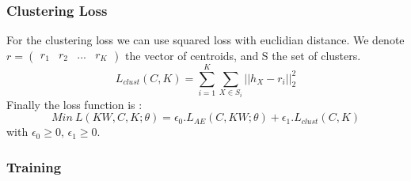 \subsubsection{Clustering Loss}

For the clustering loss we can use squared loss with euclidian distance. We
denote $r = \begin{pmatrix} r_1 & r_2 & ... & r_K\end{pmatrix}$ the vector of
centroids, and S the set of clusters.  
\begin{equation}\label{eq:loss_clust}
  L_{clust}(C,K) = \sum_{i=1}^K \sum_{X \in S_i} ||h_X - r_i ||_2^2 
\end{equation}
Finally the loss function is :
\begin{equation}\label{eq:loss_FINALE}
  Min~L(KW, C, K; \theta) = \epsilon_0.L_{AE}(C, KW; \theta) 
  + \epsilon_1.L_{clust}(C,K)
\end{equation}
with $\epsilon_0 \geq 0$, $\epsilon_1 \geq 0$.

\subsubsection{Training}

